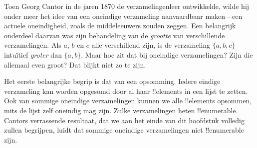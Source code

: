 \documentclass[../../../include/open-logic-section]{subfiles}
\begin{document}


Toen Georg Cantor in de jaren 1870 de verzamelingenleer ontwikkelde, wilde hij
onder meer het idee van een oneindige verzameling aanvaardbaar maken---een
actuele oneindigheid, zoals de middeleeuwers zouden zeggen. Een belangrijk
onderdeel daarvan was zijn behandeling van de \emph{grootte} van verschillende
verzamelingen. Als $a$, $b$ en $c$ alle verschillend zijn, is de verzameling
$\{a, b, c\}$ intuïtief \emph{groter} dan $\{a, b\}$. Maar hoe zit dat bij
oneindige verzamelingen? Zijn die allemaal even groot? Dat blijkt niet zo te
zijn.

Het eerste belangrijke begrip is dat van een opsomming. Iedere eindige
verzameling kan worden opgesomd door al haar !!{element}s in een lijst te
zetten. Ook van sommige oneindige verzamelingen kunnen we alle !!{element}s
opsommen, mits de lijst zelf oneindig mag zijn. Zulke verzamelingen heten
!!{enumerable}. Cantors verrassende resultaat, dat we aan het einde van dit
hoofdstuk volledig zullen begrijpen, luidt dat sommige oneindige verzamelingen
niet !!{enumerable} zijn.
\end{document}
